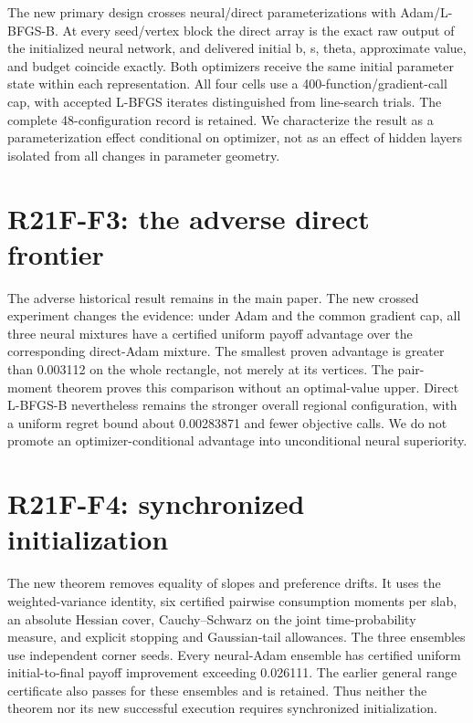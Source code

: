 \documentclass[ecta]{econsocart}
\theoremstyle{remark}
\begin{document}
The new primary design crosses neural/direct parameterizations with Adam/L-BFGS-B. At every seed/vertex block the direct array is the exact raw output of the initialized neural network, and delivered initial b, s, theta, approximate value, and budget coincide exactly. Both optimizers receive the same initial parameter state within each representation. All four cells use a 400-function/gradient-call cap, with accepted L-BFGS iterates distinguished from line-search trials. The complete 48-configuration record is retained. We characterize the result as a parameterization effect conditional on optimizer, not as an effect of hidden layers isolated from all changes in parameter geometry.

\section{R21F-F3: the adverse direct frontier}

The adverse historical result remains in the main paper. The new crossed experiment changes the evidence: under Adam and the common gradient cap, all three neural mixtures have a certified uniform payoff advantage over the corresponding direct-Adam mixture. The smallest proven advantage is greater than 0.003112 on the whole rectangle, not merely at its vertices. The pair-moment theorem proves this comparison without an optimal-value upper. Direct L-BFGS-B nevertheless remains the stronger overall regional configuration, with a uniform regret bound about 0.00283871 and fewer objective calls. We do not promote an optimizer-conditional advantage into unconditional neural superiority.

\section{R21F-F4: synchronized initialization}

The new theorem removes equality of slopes and preference drifts. It uses the weighted-variance identity, six certified pairwise consumption moments per slab, an absolute Hessian cover, Cauchy--Schwarz on the joint time-probability measure, and explicit stopping and Gaussian-tail allowances. The three ensembles use independent corner seeds. Every neural-Adam ensemble has certified uniform initial-to-final payoff improvement exceeding 0.026111. The earlier general range certificate also passes for these ensembles and is retained. Thus neither the theorem nor its new successful execution requires synchronized initialization.
\end{document}
